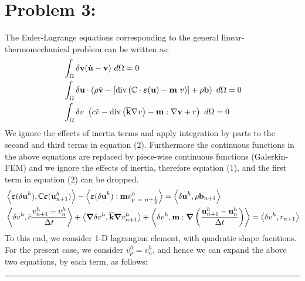 \section*{Problem 3: }
The Euler-Lagrange equations corresponding to the general linear-thermomechanical problem can be written as: 
\begin{align}
& \int_{\Omega} \delta {\bf v} (\dot{\bf u} - {\bf v})\ d\Omega = 0 \\
& \int_{\Omega} \delta {\bf u}\cdot \left(\rho \dot{\bf v} - 
\left[ 
{\rm div} 
\left(
{\mathbb{C}\cdot{\bm\varepsilon({\bf u})}-{\bf m}\ v}
\right)
\right]+\rho
{\bf b}
\right)\ d\Omega = 0 \\
& \int_{\Omega}
\delta v\ \left(
c\dot{v}
-
{\rm div} 
\left(
\overline{\bf k}\nabla v
\right)
- {\bf m} : \nabla {\bf v} + r
\right)\ d\Omega = 0
\end{align}
We ignore the effects of inertia terms and apply integration by parts to the second and third terms in equation (2). Furthermore the continuous functions in the above equations are replaced by piece-wise continuous functions (Galerkin-FEM) and we ignore the effects of inertia, therefore equation (1), and the first term in equation (2) can be dropped.  
\begin{align}
& \left< 
{\bm\varepsilon({\bf \delta u}^h),\mathbb{C}{\bm\varepsilon}({\bf u}^h_{n+1})}
\right>
- 
\left<
\bm\varepsilon({\bf \delta u}^h) : {\bf m} v^h_{p\ =\ n+\frac{1}{2}}
\right>
=
\left<
{\bf \delta u}^h,{\bf\rho}{\bf b}_{n+1} 
\right> \\
& \left<
\delta v^h , \overline{c}\frac{v^h_{n+1}-v^h_{n}}{\Delta t}
\right> + 
\left<
\bm\nabla\delta v^h , {\bf \overline{\bf k}}{\bm\nabla}v^h_{n+1}
\right>
+
\left<
\delta v^h , {\bf m} : {\bm\nabla}
\left(
\frac{{\bf u}^h_{n+1} - {\bf u}^h_{n}}{\Delta t}
\right)
\right>
=
\left<
\delta v^h , r_{n+1}
\right>
\end{align}
To this end, we consider 1-D lagrangian element, with quadratic shape fucntions. For the present case, we consider $v^h_p = v^h_n$, and hence we can expand the above two equations, by each term, as follows:\\ \hrule
